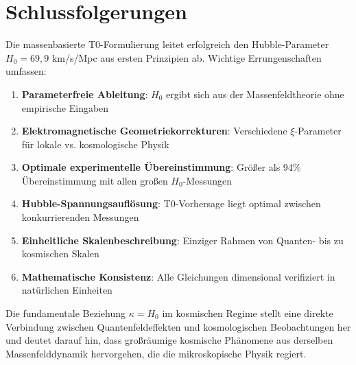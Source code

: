 \documentclass[12pt,a4paper]{article}
\begin{document}
	\section{Schlussfolgerungen}
	
	Die massenbasierte T0-Formulierung leitet erfolgreich den Hubble-Parameter $H_0 = 69{,}9$ km/s/Mpc aus ersten Prinzipien ab. Wichtige Errungenschaften umfassen:
	
	\begin{enumerate}
		\item \textbf{Parameterfreie Ableitung}: $H_0$ ergibt sich aus der Massenfeldtheorie ohne empirische Eingaben
		\item \textbf{Elektromagnetische Geometriekorrekturen}: Verschiedene $\xi$-Parameter für lokale vs. kosmologische Physik
		\item \textbf{Optimale experimentelle Übereinstimmung}: Größer als 94\% Übereinstimmung mit allen großen $H_0$-Messungen
		\item \textbf{Hubble-Spannungsauflösung}: T0-Vorhersage liegt optimal zwischen konkurrierenden Messungen
		\item \textbf{Einheitliche Skalenbeschreibung}: Einziger Rahmen von Quanten- bis zu kosmischen Skalen
		\item \textbf{Mathematische Konsistenz}: Alle Gleichungen dimensional verifiziert in natürlichen Einheiten
	\end{enumerate}
	
	Die fundamentale Beziehung $\kappa = H_0$ im kosmischen Regime stellt eine direkte Verbindung zwischen Quantenfeldeffekten und kosmologischen Beobachtungen her und deutet darauf hin, dass großräumige kosmische Phänomene aus derselben Massenfelddynamik hervorgehen, die die mikroskopische Physik regiert.
	
\end{document}
